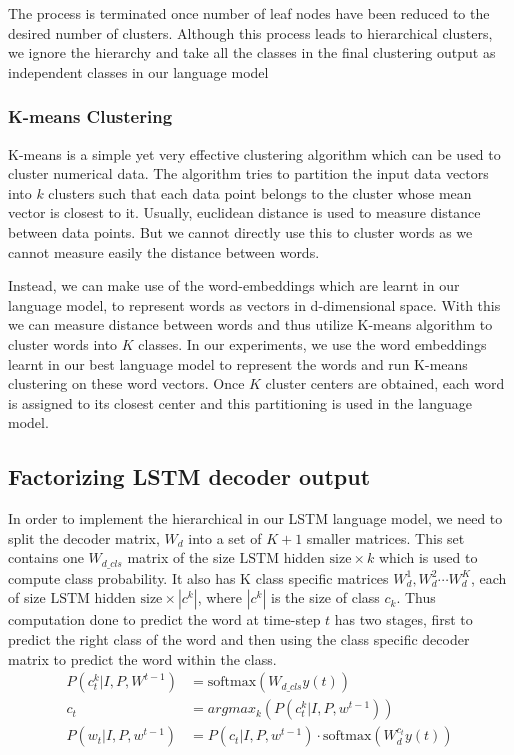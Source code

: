 The process is terminated once number of leaf nodes have been reduced to the
desired number of clusters. 
Although this process leads to hierarchical clusters, we ignore the hierarchy
and take all the classes in the final clustering output as independent classes
in our language model 
\subsubsection{K-means Clustering}

K-means is a simple yet very effective clustering algorithm which can be used to
cluster numerical data.
The algorithm tries to partition the input data vectors into $k$ clusters such
that each data point belongs to the cluster whose mean vector is closest to it.
Usually, euclidean distance is used to measure distance between data points.
But we cannot directly use this to cluster words as we cannot measure easily the
distance between words.

Instead, we can make use of the word-embeddings which are learnt in our language
model, to represent words as vectors in d-dimensional space.
With this we can measure distance between words and thus utilize K-means
algorithm to cluster words into $K$ classes.
In our experiments, we use the word embeddings learnt in our best language model to
represent the words and run K-means clustering on these word vectors.
Once $K$ cluster centers are obtained, each word is assigned to its closest center
and this partitioning is used in the language model.

\subsection{Factorizing LSTM decoder output}
In order to implement the hierarchical in our LSTM language model, we need to
split the decoder matrix, $W_d$ into a set of $K+1$ smaller matrices.
This set contains one $W_{d\_cls}$  matrix of the size $\text{LSTM hidden size}
\times k$
which is used to compute class probability.
It also has K class specific matrices ${W_{d}^{1},W_{d}^{2}\cdots W_{d}^{K}}$,
each of size $\text{LSTM hidden size}\times |c^k|$, where $|c^k|$ is the size of class
$c_k$.
Thus computation done to predict the word at time-step $t$ has two stages, first
to predict the right class of the word and then using the class specific decoder
matrix to predict the word within the class.
\begin{align}
        \label{eq:classLStmdecoder}
        P(c_{t}^{k}| I,P, W^{t-1}) &= \text{softmax}(W_{d\_cls} y(t)) \\
        c_t &= argmax_k\left(P(c_{t}^k| I,P, w^{t-1})\right) \\
        P(w_t | I,P, w^{t-1}) &= P(c_t| I,P, w^{t-1}) \cdot \text{softmax}(W_{d}^{c_t} y(t))
\end{align}

